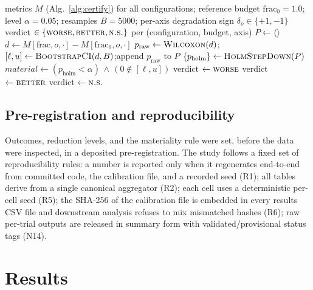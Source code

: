 \documentclass[fleqn,10pt]{wlscirep}
\begin{document}
\begin{algorithm}[t]
\caption{\textsc{AggregateAndDecide}: direction-resolved materiality.}
\label{alg:decide}
\begin{algorithmic}[1]
\Require metrics $M$ (Alg.~\ref{alg:certify}) for all configurations; reference budget
  $\mathrm{frac}_0{=}1.0$; level $\alpha{=}0.05$; resamples $B{=}5000$; per-axis degradation sign
  $\delta_o\in\{+1,-1\}$
\Ensure verdict $\in\{\textsc{worse},\textsc{better},\textsc{n.s.}\}$ per (configuration, budget, axis)
  \State $P \gets \langle\rangle$ 
    \State $d \gets M[\mathrm{frac},o,\cdot] - M[\mathrm{frac}_0,o,\cdot]$
    \State $p_{\mathrm{raw}} \gets \textsc{Wilcoxon}(d)$;\quad
      $[\ell,u]\gets\textsc{BootstrapCI}(d,B)$;\quad append $p_{\mathrm{raw}}$ to $P$
  \EndFor
  \State $\{p_{\mathrm{holm}}\} \gets \textsc{HolmStepDown}(P)$
    \State $\mathit{material} \gets (p_{\mathrm{holm}}<\alpha) \,\wedge\, (0\notin[\ell,u])$
     verdict $\gets \textsc{worse}$
     verdict $\gets \textsc{better}$
    \Else{} verdict $\gets \textsc{n.s.}$
    \EndIf
  \EndFor
\EndFor
\end{algorithmic}
\end{algorithm}

\subsection{Pre-registration and reproducibility}
\label{sec:prereg}
Outcomes, reduction levels, and the materiality rule were set, before the data were inspected, in a
deposited pre-registration. The study follows a fixed set of reproducibility rules:
a number is reported only when it regenerates end-to-end from committed code, the calibration file,
and a recorded seed (R1); all tables derive from a single canonical aggregator (R2); each cell
uses a deterministic per-cell seed (R5); the SHA-256 of the calibration file is embedded in
every results CSV file and downstream analysis refuses to mix mismatched hashes (R6); raw
per-trial outputs are released in summary form with validated/provisional status tags (N14).

\section{Results}
\label{sec:results}
\end{document}
